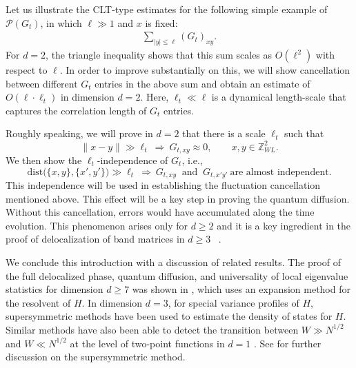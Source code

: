 Let us illustrate the CLT-type estimates for the following simple example of $\mathcal{P}(G_{t})$, in which $\ell\gg1$ and $x$ is fixed:
%
\begin{align*}
\sum_{|y|\leq \ell} (G_{t})_{xy}.
\end{align*}
%
For $d=2$, the triangle inequality shows that this sum scales as $O(\ell^{2})$ with respect to $\ell$. In order to improve substantially on this, we will show cancellation between different $G_{t}$ entries in the above sum and obtain an estimate of $O(\ell\cdot\ell_{t})$ in dimension $d=2$. Here, $\ell_{t}\ll\ell$ is a dynamical length-scale that captures the correlation length of $G_{t}$ entries. 



Roughly speaking, we will prove in  $d=2$ that there is a scale $\ell_t$ such that 
\[
\|x-y\|\gg \ell_t \ \Longrightarrow\  G_{t, xy}\approx 0,\qquad x,y\in\mathbb Z_{WL}^{2} .
\]
We then show   the \(\ell_t\)-independence of \(G_{t}\), i.e., 
\[
\mathrm{dist}\!\big(\{x,y\},\{x',y'\}\big)\gg \ell_t \ \Longrightarrow\  G_{t,xy}\ \text{ and }\ G_{t,x'y'}\ \text{are almost independent}.
\]
This independence will be used in establishing the fluctuation cancellation mentioned above. This effect will be a key step in proving 
the quantum diffusion.  Without this cancellation,  errors would have accumulated along the time evolution. This  phenomenon arises only for 
\(d\ge 2\) and it is  a key ingredient in the proof  of  delocalization of band matrices in \(d\ge 3\) ~\cite{DYYY25}.







We conclude this introduction with a discussion of related results. The proof of the full delocalized phase, quantum diffusion, and universality of local eigenvalue statistics for dimension $d\geq 7$ was shown in \cite{yang2021delocalization, yang2022delocalization, Xu:2024aa}, which uses an expansion method for the resolvent of $H$. In dimension $d=3$, for special variance profiles of $H$, supersymmetric methods have been used \cite{DisPinSpe2002} to estimate the density of states for $H$. Similar methods have also been able to detect the transition between $W\gg N^{1/2}$ and $W\ll N^{1/2}$ at the level of two-point functions in $d=1$ \cite{Shcherbina:2021wz}. See \cite{BaoErd2015, SchMT, Sch1, Sch2, Efe1997, Spe} for further discussion on the supersymmetric method.


